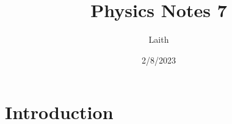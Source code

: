 \documentclass{article}
\title{Physics Notes 7}
\date{2/8/2023}
\author{Laith}
\begin{document}
\maketitle

\section{Introduction}
\end{document}
